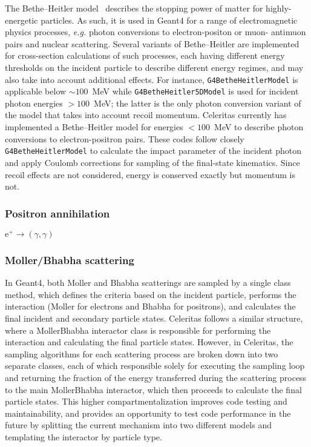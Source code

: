 \documentclass{webofc}
\begin{document}
The Bethe--Heitler model~\cite{Bethe:1934za} describes the stopping power of
matter for highly-energetic particles.
As such, it is used in Geant4 for a range of electromagnetic
physics processes, \textit{e.g.} photon conversions to electron-positon or muon-
antimuon pairs and nuclear scattering.
Several variants of Bethe--Heitler are implemented for cross-section
calculations of such processes, each having different energy thresholds on the
incident particle to describe different energy regimes, and may also take into
account additional effects.
For instance, \texttt{G4BetheHeitlerModel} is applicable below
$\sim100$~MeV while \texttt{G4BetheHeitler5DModel} is used for incident photon
energies $>100$~MeV;
the latter is the only photon conversion variant of the model that takes into
account recoil momentum.
Celeritas currently has implemented a Bethe--Heitler model for energies
$< 100$~MeV to describe photon conversions to electron-positron pairs.
These codes follow closely \texttt{G4BetheHeitlerModel} to calculate
the impact parameter of the incident photon and apply Coulomb corrections for
sampling of the final-state kinematics.
Since recoil effects are not considered, energy is conserved exactly but
momentum is not.
\subsubsection{Positron annihilation}

$\textrm{e}^+ \to (\gamma, \gamma)$

\subsubsection{Moller/Bhabha scattering}

In Geant4, both Moller and Bhabha scatterings are sampled by a single
class method, which defines the criteria based on the incident particle,
performs the interaction (Moller for electrons and Bhabha for positrons), and
calculates the final incident and secondary particle states. Celeritas
follows a similar structure, where a MollerBhabha interactor class is
responsible for performing the interaction and calculating the final particle
states. However, in Celeritas, the sampling algorithms for each scattering
process are broken down into two separate classes, each of which responsible
solely for executing the sampling loop and returning the fraction of the energy
transferred during the scattering process to the main MollerBhabha interactor,
which then proceeds to calculate the final particle states. This higher
compartmentalization improves code testing and maintainability, and provides
an opportunity to test code performance in the future by splitting the current
mechanism into two different models and templating the interactor by particle
type.
\end{document}
